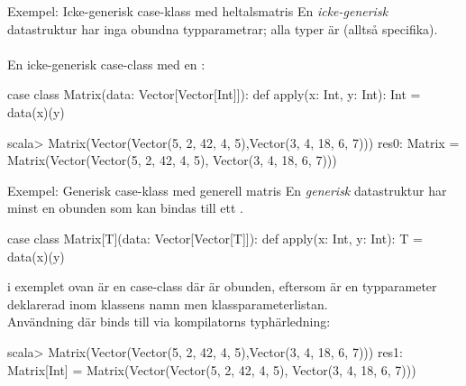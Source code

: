 



\begin{Slide}{Exempel: Icke-generisk case-klass med heltalsmatris}
  En \emph{icke-generisk} datastruktur har inga obundna typparametrar; alla typer är  (alltså specifika). \\~\\ En icke-generisk case-class med en :
  \begin{Code}
  case class Matrix(data: Vector[Vector[Int]]):
    def apply(x: Int, y: Int): Int = data(x)(y)
  \end{Code}

  \begin{REPL}
  scala> Matrix(Vector(Vector(5, 2, 42, 4, 5),Vector(3, 4, 18, 6, 7)))
  res0: Matrix =
    Matrix(Vector(Vector(5, 2, 42, 4, 5), Vector(3, 4, 18, 6, 7)))
  \end{REPL}

\end{Slide}





\begin{Slide}{Exempel: Generisk case-klass med generell matris}
  En \emph{generisk} datastruktur har minst en obunden  som kan bindas  till ett  .
  
  \begin{Code}
  case class Matrix[T](data: Vector[Vector[T]]):
    def apply(x: Int, y: Int): T = data(x)(y)
  \end{Code}
   i exemplet ovan är en  case-class där  är obunden, eftersom  är en typparameter deklarerad inom \code{[]}  klassens namn men  klassparameterlistan. \\

  \vspace{0.5em} Användning där  binds till  via kompilatorns typhärledning:
  \begin{REPL}
  scala> Matrix(Vector(Vector(5, 2, 42, 4, 5),Vector(3, 4, 18, 6, 7)))
  res1: Matrix[Int] =
    Matrix(Vector(Vector(5, 2, 42, 4, 5), Vector(3, 4, 18, 6, 7)))
  \end{REPL}

\end{Slide}




